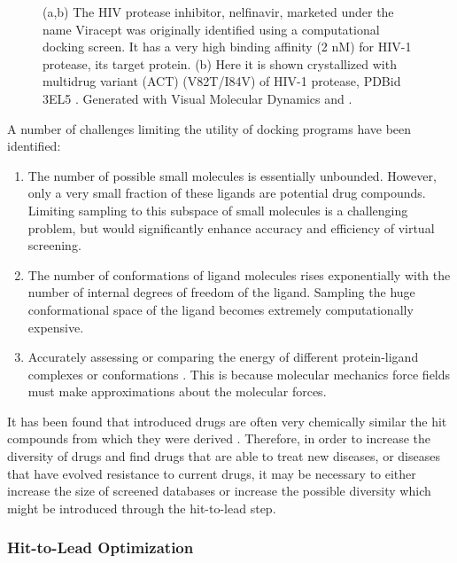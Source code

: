 \begin{figure}[h]
\begin{subfigure}[b]{0.3\textwidth}
        \label{fig:nelfinavir_docked}
        \caption{}
    \end{subfigure}
    \caption{(a,b) The HIV protease inhibitor, nelfinavir, marketed under the name Viracept was originally identified using a computational docking screen.
It has a very high binding affinity (2 nM) for HIV-1 protease, its target protein.
(b) Here it is shown crystallized with multidrug variant (ACT) (V82T/I84V) of HIV-1 protease, PDBid 3EL5 \protect\cite{king2012extreme}.
Generated with Visual Molecular Dynamics \protect\cite{humphrey1996vmd} and \protect\cite{povray}.}
\label{figure:nelfinavir}
\end{figure}

A number of challenges limiting the utility of docking programs have been identified:
\begin{enumerate}
    \item The number of possible small molecules is essentially unbounded.
    However, only a very small fraction of these ligands are potential drug compounds.
    Limiting sampling to this subspace of small molecules is a challenging problem, but would significantly enhance accuracy and efficiency of virtual screening.
    \item The number of conformations of ligand molecules rises exponentially with the number of internal degrees of freedom of the ligand.
    Sampling the huge conformational space of the ligand becomes extremely computationally expensive.
    \item Accurately assessing or comparing the energy of different protein-ligand complexes or conformations \cite{shoichet2004virtual}.
    This is because molecular mechanics force fields must make approximations about the molecular forces.
\end{enumerate}

It has been found that introduced drugs are often very chemically similar the hit compounds from which they were derived \cite{proudfoot2002drugs}.
Therefore, in order to increase the diversity of drugs and find drugs that are able to treat new diseases, or diseases that have evolved resistance to current drugs, it may be necessary to either increase the size of screened databases or increase the possible diversity which might be introduced through the hit-to-lead step.

\subsubsection{Hit-to-Lead Optimization}
\label{subsubsection:hit_to_lead}


